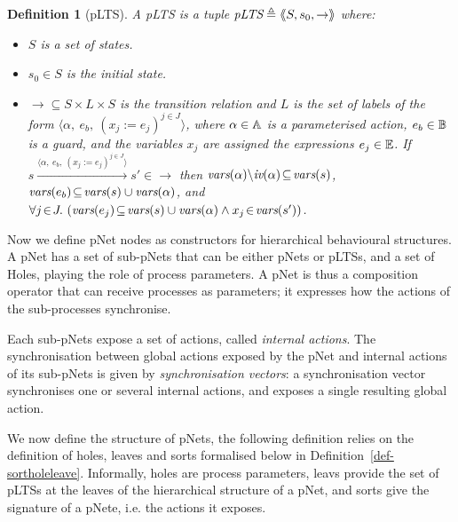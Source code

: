 \documentclass{lmcs}
\newtheorem{definition}{Definition}
\begin{document}
\begin{definition}[pLTS]
\label{pLTS}
A pLTS is a tuple
$\pLTS\triangleq\mylangle S,s_0, \to\myrangle$ where:
\begin{itemize}
\item[$\bullet$]
$S$ is a set of states.
\item[$\bullet$]
$s_0 \in S$ is the initial state.
\item[$\bullet$] $\to \subseteq S \times L \times S$ is the transition relation and 
$L$ is the set of labels of the form
$\langle \alpha,~e_b,~(x_j\!:= {e}_j)^{j\in J}\rangle$,
where $\alpha \in\mathbb{A}$ is a parameterised action, $e_b \in
\mathbb{B}$ is a guard, and the variables $x_j$ 
are assigned the expressions $e_j\in \mathbb{E}$.
If 
$s \xrightarrow{\langle \alpha,~e_b,~(x_j\!:= {e}_j)^{j\in
		J}\rangle} s'\in \to $ then 
		$\vars(\alpha)\backslash \iv(\alpha)\!\subseteq\! \vars(s)$, 
		$\vars(e_b)\!\subseteq\! \vars(s)\cup\vars(\alpha)$, and
		$\forall j\!\in\! J .\,\left(\vars(e_j)\!\subseteq\! \vars(s)\cup\vars(\alpha)\land 
		x_j\!\in\!\vars(s') \right)$. %
\end{itemize}
\end{definition}

Now we define
pNet nodes as constructors for hierarchical behavioural structures.
A pNet has a set of sub-pNets that can be either pNets or pLTSs, and a
set of Holes, playing the role of process parameters. A pNet is thus a composition operator that can receive processes as parameters; it expresses how the actions of the sub-processes synchronise.

Each sub-pNets expose
a set of actions, called \emph{internal actions}. The synchronisation between global actions exposed by the pNet and
internal actions of its sub-pNets is given by  \emph{synchronisation vectors}: a
synchronisation vector synchronises one or several internal actions, and
exposes a single resulting global action.


We now define the structure of pNets, the following definition relies on the definition 
of holes, leaves and sorts formalised below in Definition~\ref{def-sortholeleave}. Informally, holes are process parameters, leavs provide the set of pLTSs at the leaves of the hierarchical structure of a pNet, and sorts give the signature of a pNete, i.e. the actions it exposes.
\end{document}

